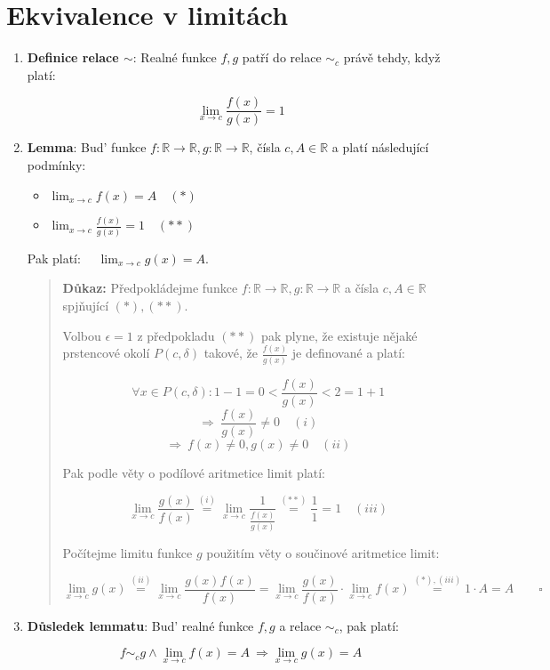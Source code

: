 \documentclass[12pt]{article}
\begin{document}
\section*{Ekvivalence v limitách}

\begin{enumerate}
  \item \textbf{Definice relace $\sim$}: Realné funkce $f,g$ patří do relace $\sim_c$ právě tehdy, když platí:

  \[
    \lim_{x\to c} \frac{f(x)}{g(x)} = 1
  \]

  \item \textbf{Lemma}: Bud' funkce $f: \mathbb{R} \to \mathbb{R}, g: \mathbb{R} \to \mathbb{R}$, čísla $c,A \in \mathbb{R}$
a platí následující podmínky:

\begin{itemize}
  \item $\lim_{x\to c}f(x) = A \quad (*)$
  \item $\lim_{x\to c} \frac{f(x)}{g(x)} = 1 \quad (**)$
\end{itemize}

Pak platí: $\quad \lim_{x\to c}g(x) = A$.

\medskip
\begin{quote}
\textbf{Důkaz:}
Předpokládejme funkce $f: \mathbb{R} \to \mathbb{R}, g: \mathbb{R} \to \mathbb{R}$ a čísla $c,A \in \mathbb{R}$
spjňující $(*),(**)$.

Volbou $\epsilon = 1$ z předpokladu $(**)$ pak plyne, že existuje nějaké prstencové okolí $P(c,\delta)$ takové, že
$\frac{f(x)}{g(x)}$ je definované a platí:

\[
\forall x \in P(c,\delta) : 1-1=0 < \frac{f(x)}{g(x)} < 2=1+1
\]
\[
\Longrightarrow \ \frac{f(x)}{g(x)} \neq 0 \quad (i)
\]
\[
\Longrightarrow \ f(x) \neq 0, g(x) \neq 0 \quad (ii)
\]

Pak podle věty o podílové aritmetice limit platí:

\[
\lim_{x\to c} \frac{g(x)}{f(x)} \overset{(i)}{=} \lim_{x\to c} \frac{1}{\frac{f(x)}{g(x)}} \overset{(**)}{=} \frac{1}{1} = 1
\quad (iii)
\]

Počítejme limitu funkce $g$ použitím věty o součinové aritmetice limit:

\[
\lim_{x\to c}g(x) \overset{(ii)}{=} \lim_{x\to c}\frac{g(x)f(x)}{f(x)} = \lim_{x\to c}\frac{g(x)}{f(x)} \cdot \lim_{x\to c}f(x)
\overset{(*),(iii)}{=} 1 \cdot A = A \quad\quad \square
\]
\end{quote}

\item \textbf{Důsledek lemmatu}: Bud' realné funkce $f,g$ a relace $\sim_c$, pak platí:

\[
  f \sim_c g \land \lim_{x\to c}f(x) = A \ \Longrightarrow \lim_{x\to c}g(x) = A
\]

\end{enumerate}
\end{document}
